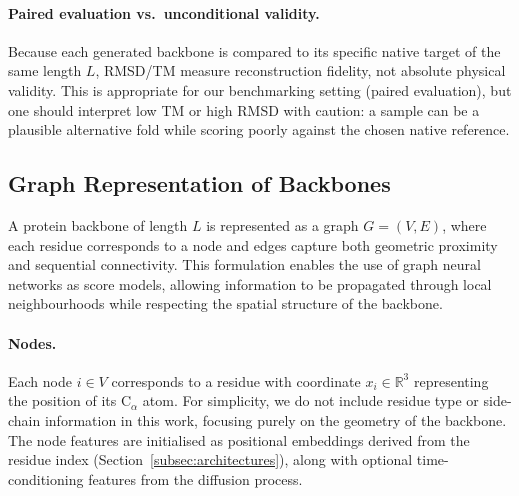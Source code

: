 \documentclass[a4paper,12pt]{article}
\begin{document}
\paragraph{Paired evaluation vs.\ unconditional validity.}
Because each generated backbone is compared to its specific native target of the same length \(L\), RMSD/TM measure reconstruction fidelity, not absolute physical validity. 
This is appropriate for our benchmarking setting (paired evaluation), but one should interpret low TM or high RMSD with caution: a sample can be a plausible alternative fold while scoring poorly against the chosen native reference.

\subsection{Graph Representation of Backbones}\label{subsec:graph-repr}
A protein backbone of length \(L\) is represented as a graph \(G=(V,E)\), where each residue corresponds to a node and edges capture both geometric proximity and sequential connectivity. This formulation enables the use of graph neural networks as score models, allowing information to be propagated through local neighbourhoods while respecting the spatial structure of the backbone. 

\paragraph{Nodes.}
Each node \(i \in V\) corresponds to a residue with coordinate \(x_i \in \mathbb{R}^3\) representing the position of its C\(_\alpha\) atom. For simplicity, we do not include residue type or side-chain information in this work, focusing purely on the geometry of the backbone. The node features are initialised as positional embeddings derived from the residue index (Section~\ref{subsec:architectures}), along with optional time-conditioning features from the diffusion process.
\end{document}

